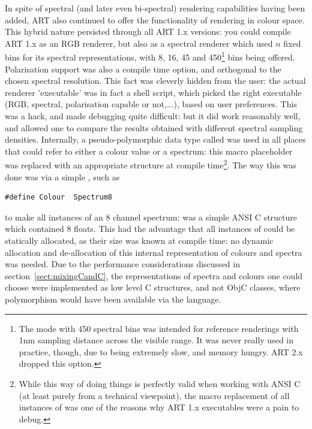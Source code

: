 In spite of spectral (and later even bi-spectral) rendering capabilities having been added, ART also continued to offer the functionality of rendering in colour space. This hybrid nature persisted through all ART 1.x versions: you could compile ART 1.x as an RGB renderer, but also as a spectral renderer which used $n$ fixed bins for its spectral representations, with 8, 16, 45 and 450\footnote{The mode with 450 spectral bins was intended for reference renderings with 1nm sampling distance across the visible range. It was never really used in practice, though, due to being extremely slow, and memory hungry. ART 2.x dropped this option.} bins being offered. Polarisation support was also a compile time option, and orthogonal to the chosen spectral resolution. This fact was cleverly hidden from the user: the actual renderer 'executable'  was in fact a shell script, which picked the right executable (RGB, spectral, polarisation capable or not,...), based on user preferences. This was a hack, and made debugging quite difficult: but it did work reasonably well, and allowed one to compare the results obtained with different spectral sampling densities. Internally, a pseudo-polymorphic data type called  was used in all places that could refer to either a colour value or a spectrum: this macro placeholder was replaced with an appropriate structure at compile time\footnote{While this way of doing things is perfectly valid when working with ANSI C (at least purely from a technical viewpoint), the macro replacement of all instances of  was one of the reasons why ART 1.x executables were a pain to debug.}. The way this was done was via a simple , such as \eg

\begin{verbatim}
#define Colour  Spectrum8
\end{verbatim}

to make all instances of  an 8 channel spectrum:  was a simple ANSI C structure which contained 8 floats. This had the advantage that all instances of  could be statically allocated, as their size was known at compile time: no dynamic allocation and de-allocation of this internal representation of colours and spectra was needed. Due to the performance considerations discussed in section~\ref{sect:mixingCandC}, the representations of spectra and colours one could choose were implemented as low level C structures, and not ObjC classes, where polymorphism would have been available via the language.

